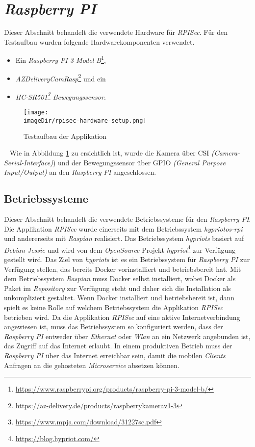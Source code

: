 \section{\emph{Raspberry PI}}
\label{sec:raspberrypi}
Dieser Abschnitt behandelt die verwendete Hardware für \emph{RPISec}. Für den Testaufbau wurden folgende Hardwarekomponenten verwendet.
\begin{itemize}
	\item Ein \emph{Raspberry PI 3 Model B}\footnote{\url{https://www.raspberrypi.org/products/raspberry-pi-3-model-b/}},
	\item \emph{AZDeliveryCamRasp}\footnote{\url{https://az-delivery.de/products/raspberrykamerav1-3}} und ein
	\item \emph{HC-SR501\footnote{\url{https://www.mpja.com/download/31227sc.pdf}} Bewegungssensor}.
\end{itemize}
\begin{figure}[h]
	\centering
	\texttt{[image: \\imageDir/rpisec-hardware-setup.png]}
	\caption{Testaufbau der Applikation}
	\label{fig:image-hardware-setup}
\end{figure}
\ \newline
Wie in Abbildung \ref{fig:image-hardware-setup} zu ersichtlich ist, wurde die Kamera über CSI \emph{(Camera-Serial-Interface)}) und der Bewegungssensor über GPIO \emph{(General Purpose Input/Output)} an den \emph{Raspberry PI} angeschlossen.

\subsection{Betriebssysteme}
Dieser Abschnitt behandelt die verwendete Betriebssysteme für den \emph{Raspberry PI}. Die Applikation \emph{RPISec} wurde einerseits mit dem Betriebssystem \emph{hypriotos-rpi} und andererseits mit \emph{Raspian} realisiert. Das Betriebssystem \emph{hypriots} basiert auf \emph{Debian Jessie} und wird von dem \emph{OpenSource} Projekt \emph{hypriot}\footnote{\url{https://blog.hypriot.com/}} zur Verfügung gestellt wird. Das Ziel von \emph{hypriots} ist es ein Betriebssystem für \emph{Raspberry PI} zur Verfügung stellen, das bereits Docker vorinstalliert und betriebsbereit hat. Mit dem Betriebssystem \emph{Raspian} muss Docker selbst installiert, wobei Docker als Paket im \emph{Repository} zur Verfügung steht und daher sich die Installation als unkompliziert gestaltet.
\newline
\newline
Wenn Docker installiert und betriebsbereit ist, dann spielt es keine Rolle auf welchem Betriebssystem die Applikation \emph{RPISec} betrieben wird.
\newline
\newline
Da die Applikation \emph{RPISec} auf eine aktive Internetverbindung angewiesen ist, muss das Betriebssystem so konfiguriert werden, dass der \emph{Raspberry PI} entweder über \emph{Ethernet} oder \emph{Wlan} an ein Netzwerk angebunden ist, das Zugriff auf das Internet erlaubt. In einem produktiven Betrieb muss der \emph{Raspberry PI} über das Internet erreichbar sein, damit die mobilen \emph{Clients} Anfragen an die gehosteten \emph{Microservice} absetzen können.